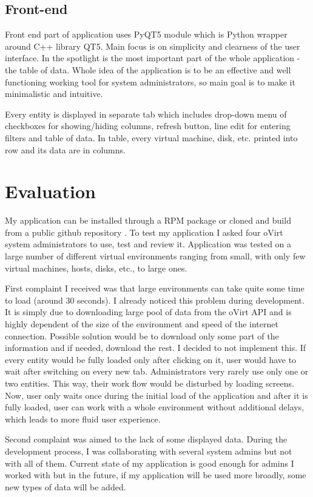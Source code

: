 \section{Front-end}
Front end part of application uses PyQT5 module which is Python wrapper around C++ library QT5. Main focus is on simplicity and clearness of the user interface. In the spotlight is the most important part of the whole application - the table of data. Whole idea of the application is to be an effective and well functioning working tool for system administrators, so main goal is to make it minimalistic and intuitive.

Every entity is displayed in separate tab which includes drop-down menu of checkboxes for showing/hiding columns, refresh button, line edit for entering filters and table of data. In table, every virtual machine, disk, etc. printed into row and its data are in columns.


\chapter{Evaluation} 
\label{chap_evaluation}
My application can be installed through a RPM package or cloned and build from a public github repository \cite{git}. To test my application I asked four oVirt system administrators to use, test and review it. Application was tested on a large number of different virtual environments ranging from small, with only few virtual machines, hosts, disks, etc., to large ones. 

First complaint I received was that large environments can take quite some time to load (around 30 seconds). I already noticed this problem during development. It is simply due to downloading large pool of data from the oVirt API and is highly dependent of the size of the environment and speed of the internet connection. Possible solution would be to download only some part of the information and if needed, download the rest. I decided to not implement this. If every entity would be fully loaded only after clicking on it, user would have to wait after switching on every new tab. Administrators very rarely use only one or two entities. This way, their work flow would be disturbed by loading screens. Now, user only waits once during the initial load of the application and after it is fully loaded, user can work with a whole environment without additional delays, which leads to more fluid user experience. 

Second complaint was aimed to the lack of some displayed data. During the development process, I was collaborating with several system admins but not with all of them. Current state of my application is good enough for admins I worked with but in the future, if my application will be used more broadly, some new types of data will be added.

